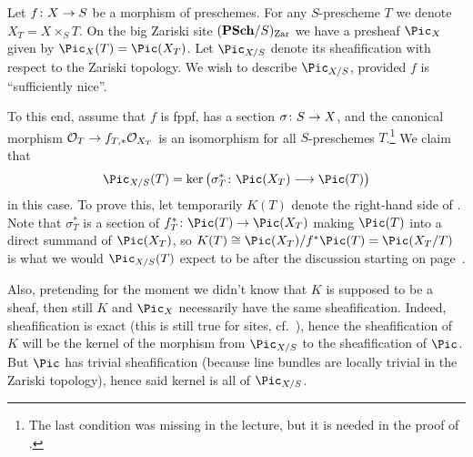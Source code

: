 \documentclass[a4paper,parskip=half,numbers=enddot, DIV=12]{scrreprt}
\begin{document}
\begin{example}
	Let $f\colon X\morphism S$ be a morphism of preschemes. For any $S$-prescheme $T$ we denote $X_T=X\times_ST$. On the big Zariski site $(\cat{PSch}/S)_\Zar$ we have a presheaf $\Pic_X$ given by $\Pic_X(T)=\Pic(X_T)$. Let $\Pic_{X/S}$ denote its sheafification with respect to the Zariski topology. We wish to describe $\Pic_{X/S}$, provided $f$ is ``sufficiently nice''.
	
	To this end, assume that $f$ is fppf, has a section $\sigma\colon S\morphism X$, and the canonical morphism $\Oo_T\morphism f_{T,*}\Oo_{X_T}$ is an isomorphism for all $S$-preschemes $T$.\footnote{The last condition was missing in the lecture, but it is needed in the proof of \cite[]{stacks-project}.} We claim that
	\begin{align}\lbl{eq:PicX/SInNiceCases}
		\Pic_{X/S}(T)=\ker\big(\sigma_T^*\colon \Pic(X_T)\morphism\Pic(T)\big)
	\end{align}
	in this case. To prove this, let temporarily $K(T)$ denote the right-hand side of . Note that $\sigma_T^*$ is a section of $f_T^*\colon \Pic(T)\morphism\Pic(X_T)$ making $\Pic(T)$ into a direct summand of $\Pic(X_T)$, so $K(T)\cong \Pic(X_T)/f^*\Pic(T)=\Pic(X_T/T)$ is what we would $\Pic_{X/S}(T)$ expect to be after the discussion starting on page~\pageref{par:EllipticCurves}. 
	
	Also, pretending for the moment we didn't know that $K$ is supposed to be a sheaf, then still $K$ and $\Pic_X$ necessarily have the same sheafification. Indeed, sheafification is exact (this is still true for sites, cf.\ \cite[]{stacks-project}), hence the sheafification of $K$ will be the kernel of the morphism from $\Pic_{X/S}$ to the sheafification of $\Pic$. But $\Pic$ has trivial sheafification (because line bundles are locally trivial in the Zariski topology), hence said kernel is all of $\Pic_{X/S}$.
	

\end{example}
\end{document}
